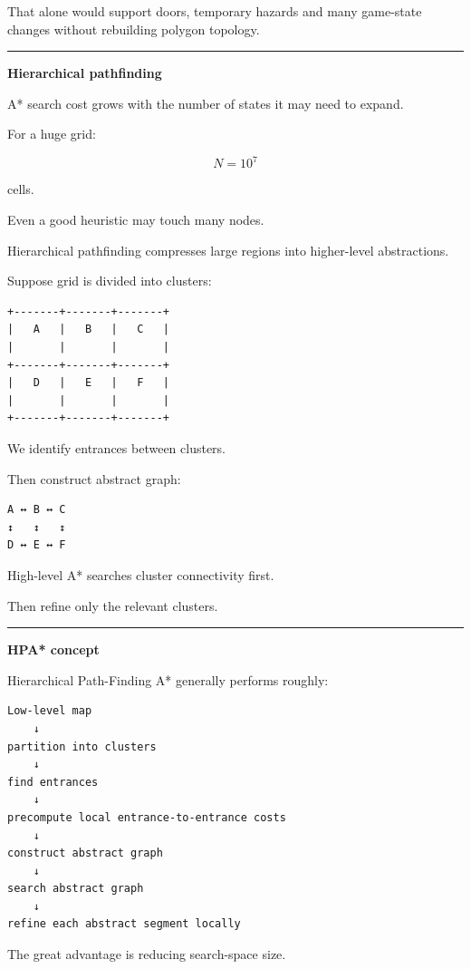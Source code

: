 That alone would support doors, temporary hazards and many game-state changes without rebuilding polygon topology.

\begin{center}\rule{0.5\linewidth}{0.5pt}\end{center}

\textbf{Hierarchical pathfinding}

A* search cost grows with the number of states it may need to expand.

For a huge grid:

\[
N=10^7
\]

cells.

Even a good heuristic may touch many nodes.

Hierarchical pathfinding compresses large regions into higher-level abstractions.

Suppose grid is divided into clusters:

\begin{verbatim}
+-------+-------+-------+
|   A   |   B   |   C   |
|       |       |       |
+-------+-------+-------+
|   D   |   E   |   F   |
|       |       |       |
+-------+-------+-------+
\end{verbatim}

We identify entrances between clusters.

Then construct abstract graph:

\begin{verbatim}
A ↔ B ↔ C
↕   ↕   ↕
D ↔ E ↔ F
\end{verbatim}

High-level A* searches cluster connectivity first.

Then refine only the relevant clusters.

\begin{center}\rule{0.5\linewidth}{0.5pt}\end{center}

\textbf{HPA* concept}

Hierarchical Path-Finding A* generally performs roughly:

\begin{verbatim}
Low-level map
    ↓
partition into clusters
    ↓
find entrances
    ↓
precompute local entrance-to-entrance costs
    ↓
construct abstract graph
    ↓
search abstract graph
    ↓
refine each abstract segment locally
\end{verbatim}

The great advantage is reducing search-space size.

